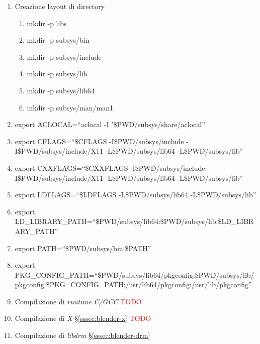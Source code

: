 \begin{enumerate}
\item Creazione layout di directory
\begin{enumerate}
\item mkdir -p libs
\item mkdir -p subsys/bin
\item mkdir -p subsys/include
\item mkdir -p subsys/lib
\item mkdir -p subsys/lib64
\item mkdir -p subsys/man/man1
\end{enumerate}
\item export ACLOCAL=``aclocal -I '\$PWD/subsys/share/aclocal''
\item export CFLAGS=``\$CFLAGS -I\$PWD/subsys/include -I\$PWD/subsys/include/X11 -L\$PWD/subsys/lib64 -L\$PWD/subsys/lib''
\item export CXXFLAGS=``\$CXXFLAGS -I\$PWD/subsys/include -I\$PWD/subsys/include/X11 -L\$PWD/subsys/lib64 -L\$PWD/subsys/lib''
\item export LDFLAGS=``\$LDFLAGS -L\$PWD/subsys/lib64 -L\$PWD/subsys/lib''
\item export LD\_LIBRARY\_PATH=``\$PWD/subsys/lib64:\$PWD/subsys/lib:\$LD\_LIBRARY\_PATH''
\item export PATH=``\$PWD/subsys/bin:\$PATH''
\item export PKG\_CONFIG\_PATH=``\$PWD/subsys/lib64/pkgconfig:\$PWD/subsys/lib/pkgconfig:\$PKG\_CONFIG\_PATH:/usr/lib64/pkgconfig:/usr/lib/pkgconfig''
\item Compilazione di \emph{runtime C/GCC} {\small\textcolor{red}{TODO}}
\item Compilazione di \emph{X} \S\ref{sssec:blender-x} {\small\textcolor{red}{TODO}}
\item Compilazione di \emph{libdrm} \S\ref{sssec:blender-drm}

\end{enumerate}
